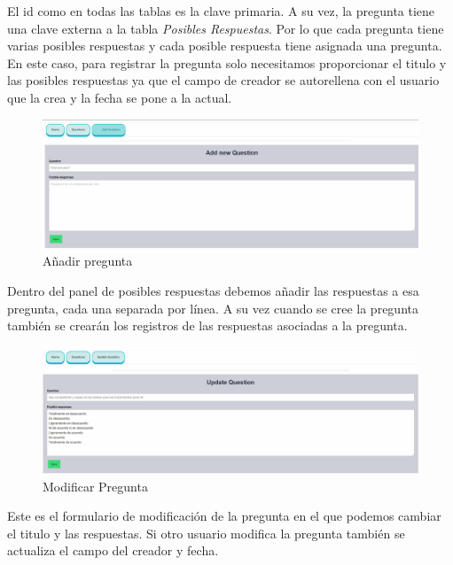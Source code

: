 El id como en todas las tablas es la clave primaria. A su vez, la pregunta tiene una clave externa a la tabla \textit{Posibles Respuestas}. Por lo que cada pregunta tiene varias posibles respuestas y cada posible respuesta tiene asignada una pregunta. En este caso, para registrar la pregunta solo necesitamos proporcionar el titulo y las posibles respuestas ya que el campo de creador se autorellena con el usuario que la crea y la fecha se pone a la actual.

\begin{figure}[!ht]
    \centering
    \includegraphics[width=1\textwidth]{imagenes/add_pregunta.png}
    \caption{ Añadir pregunta}
    \label{fig:enter-label}
\end{figure}\vspace{1cm}

Dentro del panel de posibles respuestas debemos añadir las respuestas a esa pregunta, cada una separada por línea. A su vez cuando se cree la pregunta también se crearán los registros de las respuestas asociadas a la pregunta.\vspace{3cm}

\begin{figure}
    \centering
    \includegraphics[width=1\textwidth]{imagenes/update_pregunta.png}
    \caption{ Modificar Pregunta}
    \label{fig:enter-label}
\end{figure}\vspace{3cm}

Este es el formulario de modificación de la pregunta en el que podemos cambiar el titulo y las respuestas. Si otro usuario modifica la pregunta también se actualiza el campo del creador y fecha.

